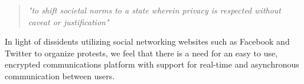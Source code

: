 \begin{quote}
\centering
\textit{"to shift societal norms to a state wherein privacy is respected without
caveat or justification"}
\end{quote}

In light of dissidents utilizing social networking websites such as Facebook and
Twitter to organize protests, we feel that there is a need for an easy to use,
encrypted communications platform with support for real-time and asynchronous
communication between users.
